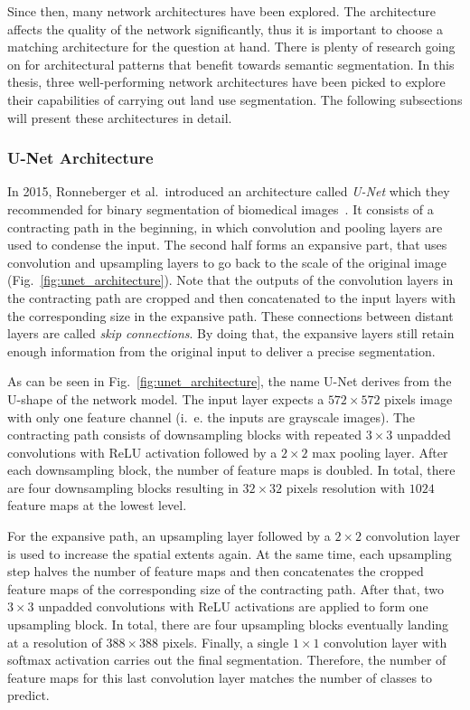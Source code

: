 Since then, many network architectures have been explored. The architecture affects the quality of the network significantly, thus it is important to choose a matching architecture for the question at hand. There is plenty of research going on for architectural patterns that benefit towards semantic segmentation. In this thesis, three well-performing network architectures have been picked to explore their capabilities of carrying out land use segmentation. The following subsections will present these architectures in detail.

\subsubsection{U-Net Architecture}
\label{sec:unet}
In 2015, Ronneberger et al.\ introduced an architecture called \emph{U-Net} which they recommended for binary segmentation of biomedical images~\cite{unet15}. It consists of a contracting path in the beginning, in which convolution and pooling layers are used to condense the input. The second half forms an expansive part, that uses convolution and upsampling layers to go back to the scale of the original image (Fig.~\ref{fig:unet_architecture}). Note that the outputs of the convolution layers in the contracting path are cropped and then concatenated to the input layers with the corresponding size in the expansive path. These connections between distant layers are called \emph{skip connections}. By doing that, the expansive layers still retain enough information from the original input to deliver a precise segmentation.

As can be seen in Fig.~\ref{fig:unet_architecture}, the name U-Net derives from the U-shape of the network model. The input layer expects a $572\times 572$ pixels image with only one feature channel (i.~e. the inputs are grayscale images). The contracting path consists of downsampling blocks with repeated $3\times 3$ unpadded convolutions with ReLU activation followed by a $2\times 2$ max pooling layer. After each downsampling block, the number of feature maps is doubled. In total, there are four downsampling blocks resulting in $32\times 32$ pixels resolution with $1024$ feature maps at the lowest level.

For the expansive path, an upsampling layer followed by a $2\times 2$ convolution layer is used to increase the spatial extents again. At the same time, each upsampling step halves the number of feature maps and then concatenates the cropped feature maps of the corresponding size of the contracting path. After that, two $3\times 3$ unpadded convolutions with ReLU activations are applied to form one upsampling block. In total, there are four upsampling blocks eventually landing at a resolution of $388\times 388$ pixels. Finally, a single $1\times 1$ convolution layer with softmax activation carries out the final segmentation. Therefore, the number of feature maps for this last convolution layer matches the number of classes to predict.

